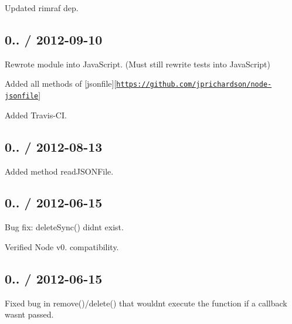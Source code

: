 \begin{DoxyItemize}
\item Updated {\ttfamily rimraf} dep.
\end{DoxyItemize}

\subsection*{0.. / 2012-\/09-\/10 }


\begin{DoxyItemize}
\item Rewrote module into Java\+Script. (Must still rewrite tests into Java\+Script)
\item Added all methods of \mbox{[}jsonfile\mbox{]}\mbox{[}\href{https://github.com/jprichardson/node-jsonfile}{\tt https\+://github.\+com/jprichardson/node-\/jsonfile}\mbox{]}
\item Added Travis-\/\+C\+I.
\end{DoxyItemize}

\subsection*{0.. / 2012-\/08-\/13 }


\begin{DoxyItemize}
\item Added method {\ttfamily read\+J\+S\+O\+N\+File}.
\end{DoxyItemize}

\subsection*{0.. / 2012-\/06-\/15 }


\begin{DoxyItemize}
\item Bug fix\+: {\ttfamily delete\+Sync()} didn\textquotesingle{}t exist.
\item Verified Node v0. compatibility.
\end{DoxyItemize}

\subsection*{0.. / 2012-\/06-\/15 }


\begin{DoxyItemize}
\item Fixed bug in {\ttfamily remove()}/{\ttfamily delete()} that wouldn\textquotesingle{}t execute the function if a callback wasn\textquotesingle{}t passed.
\end{DoxyItemize}

